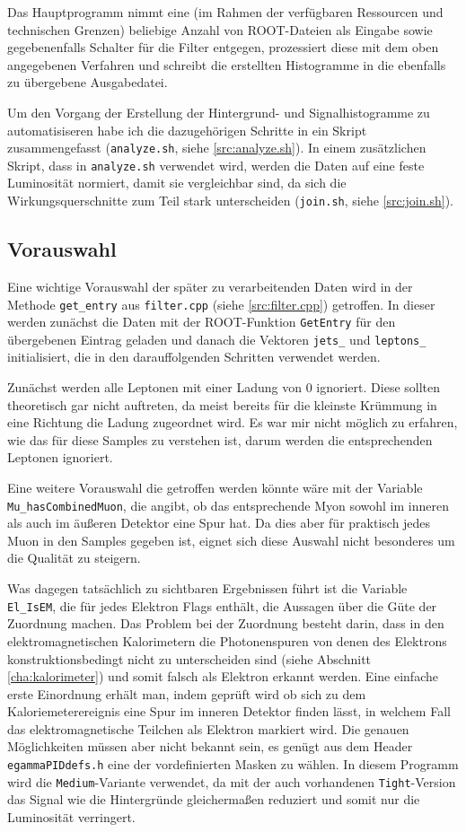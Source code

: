 Das Hauptprogramm nimmt eine (im Rahmen der verfügbaren Ressourcen und
technischen Grenzen) beliebige Anzahl von ROOT-Dateien als Eingabe sowie
gegebenenfalls Schalter für die Filter entgegen, prozessiert diese mit dem oben
angegebenen Verfahren und schreibt die erstellten Histogramme in die ebenfalls
zu übergebene Ausgabedatei.

Um den Vorgang der Erstellung der Hintergrund- und Signalhistogramme zu
automatisiseren habe ich die dazugehörigen Schritte in ein Skript
zusammengefasst (\verb'analyze.sh', siehe \ref{src:analyze.sh}). In einem
zusätzlichen Skript, dass in \verb'analyze.sh' verwendet wird, werden die Daten
auf eine feste Luminosität normiert, damit sie vergleichbar sind, da sich die
Wirkungsquerschnitte zum Teil stark unterscheiden (\verb'join.sh', siehe
\ref{src:join.sh}).

\subsection{Vorauswahl}
\label{cha:vorauswahl}
Eine wichtige Vorauswahl der später zu verarbeitenden Daten wird in der Methode
\lstinline'get_entry' aus \verb'filter.cpp' (siehe \ref{src:filter.cpp})
getroffen. In dieser werden zunächst die Daten mit der ROOT-Funktion
\lstinline'GetEntry' für den übergebenen Eintrag geladen und danach die Vektoren
\lstinline'jets_' und \lstinline'leptons_' initialisiert, die in den
darauffolgenden Schritten verwendet werden.

Zunächst werden alle Leptonen mit einer Ladung von $0$ ignoriert. Diese sollten
theoretisch gar nicht auftreten, da meist bereits für die kleinste Krümmung in
eine Richtung die Ladung zugeordnet wird. Es war mir nicht möglich zu erfahren,
wie das für diese Samples zu verstehen ist, darum werden die entsprechenden
Leptonen ignoriert.

Eine weitere Vorauswahl die getroffen werden könnte wäre mit der Variable
\lstinline'Mu_hasCombinedMuon', die angibt, ob das entsprechende Myon sowohl im
inneren als auch im äußeren Detektor eine Spur hat. Da dies aber für praktisch
jedes Muon in den Samples gegeben ist, eignet sich diese Auswahl nicht
besonderes um die Qualität zu steigern.

\label{cha:isem}
Was dagegen tatsächlich zu sichtbaren Ergebnissen führt ist die Variable
\lstinline'El_IsEM', die für jedes Elektron Flags enthält, die Aussagen über die
Güte der Zuordnung machen. Das Problem bei der Zuordnung besteht darin, dass in
den elektromagnetischen Kalorimetern die Photonenspuren von denen des Elektrons
konstruktionsbedingt nicht zu unterscheiden sind (siehe Abschnitt
\ref{cha:kalorimeter}) und somit falsch als Elektron erkannt werden. Eine
einfache erste Einordnung erhält man, indem geprüft wird ob sich zu dem
Kaloriemeterereignis eine Spur im inneren Detektor finden lässt, in welchem Fall
das elektromagnetische Teilchen als Elektron markiert wird. Die genauen
Möglichkeiten müssen aber nicht bekannt sein, es genügt aus dem Header
\texttt{egammaPIDdefs.h} eine der vordefinierten Masken zu wählen. In diesem
Programm wird die \lstinline'Medium'-Variante verwendet, da mit der auch
vorhandenen \lstinline'Tight'-Version das Signal wie die Hintergründe
gleichermaßen reduziert und somit nur die Luminosität verringert.

